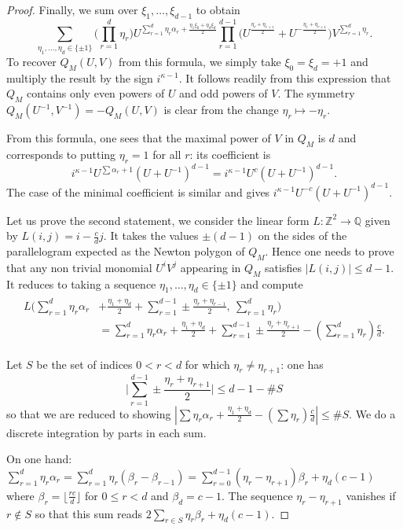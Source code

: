 \documentclass{amsart}
\newcommand{\Q}{\mathbb{Q}}
\newcommand{\Z}{\mathbb{Z}}
\theoremstyle{definition}
\begin{document}
\begin{proof}
Finally, we sum over $\xi_1,\ldots,\xi_{d-1}$ to obtain
\begin{equation}\label{PolQ}
\sum_{\eta_1,\ldots,\eta_d\in\{\pm1\}}\Big(\prod_{r=1}^d\eta_r\Big) U^{\sum_{r=1}^d \eta_r \alpha_r+\frac{\eta_1\xi_{0}+\eta_d\xi_d}{2}}\prod_{r=1}^{d-1}\Big(U^{\frac{\eta_r+\eta_{r+1}}{2}}+U^{-\frac{\eta_r+\eta_{r+1}}{2}}\Big)V^{\sum_{r=1}^d \eta_r}.
\end{equation}
To recover $Q_M(U,V)$ from this formula, we simply take $\xi_0=\xi_d=+1$ and multiply the result by the sign $i^{\kappa-1}$. It follows readily from this expression that $Q_M$ contains only even powers of $U$ and odd powers of $V$. The symmetry $Q_M(U^{-1},V^{-1})=-Q_M(U,V)$ is clear from the change $\eta_r\mapsto -\eta_r$. 

From this formula, one sees that the maximal power of $V$ in $Q_M$ is $d$ and corresponds to putting $\eta_r=1$ for all $r$: its coefficient is 
$$i^{\kappa-1} U^{\sum \alpha_r+1}(U+U^{-1})^{d-1}=i^{\kappa-1} U^{c}(U+U^{-1})^{d-1}.$$
The case of the minimal coefficient is similar and gives $i^{\kappa-1}U^{-c}(U+U^{-1})^{d-1}$.

Let us prove the second statement, we consider the linear form $L:\Z^2\to\Q$ given by $L(i,j)=i-\frac{c}{d}j$. It takes the values $\pm (d-1)$ on the sides of the parallelogram expected as the Newton polygon of $Q_M$. Hence one needs to prove that any non trivial monomial $U^iV^j$ appearing in $Q_M$ satisfies $|L(i,j)|\le d-1$. It reduces to taking a sequence $\eta_1,\ldots,\eta_d\in \{\pm 1\}$ and compute 
\begin{align*}
\begin{split}
L \Big(\sum_{r=1}^d \eta_r \alpha_r&+\frac{\eta_1+\eta_d}{2}+\sum_{r=1}^{d-1}\pm\frac{\eta_r+\eta_{r-1}}{2},\ \sum_{r=1}^d \eta_r\Big)\\
&=\sum_{r=1}^{d}\eta_r\alpha_r+\frac{\eta_1+\eta_d}{2}+\sum_{r=1}^{d-1} \pm \frac{\eta_r+\eta_{r+1}}{2}-(\sum_{r=1}^d \eta_r)\frac{c}{d}.
\end{split}
\end{align*}

Let $S$ be the set of indices $0< r<d$ for which $\eta_r\ne \eta_{r+1}$: one has 
$$\Big|\sum_{r=1}^{d-1} \pm \frac{\eta_r+\eta_{r+1}}{2}\Big|\le d-1-\#S$$
so that we are reduced to showing $|\sum \eta_r\alpha_r+\frac{\eta_1+\eta_d}{2}-(\sum\eta_r)\frac{c}{d}|\le \#S$. We do a discrete integration by parts in each sum.

On one hand: $\sum_{r=1}^d\eta_r\alpha_r=\sum_{r=1}^d\eta_r(\beta_r-\beta_{r-1})=\sum_{r=0}^{d-1}(\eta_r-\eta_{r+1})\beta_r+\eta_d(c-1)$ where $\beta_r=\lfloor \frac{rc}{d}\rfloor$ for $0\le r<d$ and $\beta_d=c-1$. 
The sequence $\eta_r-\eta_{r+1}$ vanishes if $r\notin S$ so that this sum reads $2\sum_{r\in S}\eta_r\beta_r+\eta_d(c-1)$.


\end{proof}
\end{document}
